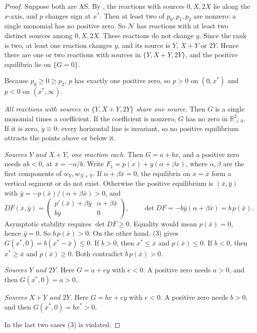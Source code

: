 \documentclass[11pt,a4paper]{report}
\providecommand{\R}{\mathbb{R}}
\newcommand{\Net}{\mathcal{N}}
\begin{document}
\begin{proof}
Suppose both are AS. By , the reactions with sources \(0,X,2X\) lie along the \(x\)-axis, and
\(p\) changes sign at \(x^*\). Then at least two of \(p_0,p_1,p_2\) are nonzero: a single monomial has no positive
zero. So \(\Net\) has reactions with at least two distinct sources among \(0,X,2X\). These reactions do not change
\(y\). Since the rank is two, at least one reaction changes \(y\), and its source is \(Y\), \(X+Y\) or \(2Y\). Hence
there are one or two reactions with sources in \(\{Y,X+Y,2Y\}\), and the positive equilibria lie on \(\{G=0\}\).

Because \(p_0\ge0\ge p_2\), \(p\) has exactly one positive zero, so \(p>0\) on \((0,x^*)\) and \(p<0\) on
\((x^*,\infty)\).

\emph{All reactions with sources in \(\{Y,X+Y,2Y\}\) share one source.} Then \(G\) is a single monomial times a
coefficient. If the coefficient is nonzero, \(G\) has no zero in \(\R^2_{>0}\). If it is zero, \(\dot y\equiv0\):
every horizontal line is invariant, so no positive equilibrium attracts the points above or below it.

\emph{Sources \(Y\) and \(X+Y\), one reaction each.} Then \(G=a+bx\), and a positive zero needs \(ab<0\), at
\(\bar x=-a/b\). Write \(F_1=p(x)+y(\alpha+\beta x)\), where \(\alpha,\beta\) are the first components of
\(w_Y,w_{X+Y}\). If \(\alpha+\beta\bar x=0\), the equilibria on \(x=\bar x\) form a vertical segment or do not exist.
Otherwise the positive equilibrium is \((\bar x,\bar y)\) with \(\bar y=-p(\bar x)/(\alpha+\beta\bar x)>0\), and
\[
DF(\bar x,\bar y)=\begin{pmatrix}p'(\bar x)+\beta\bar y & \alpha+\beta\bar x\\ b\bar y & 0\end{pmatrix},\qquad
\det DF=-b\bar y(\alpha+\beta\bar x)=b\,p(\bar x).
\]
Asymptotic stability requires \(\det DF\ge0\). Equality would mean \(p(\bar x)=0\), hence \(\bar y=0\). So
\(b\,p(\bar x)>0\). On the other hand, (3) gives \(G(x^*,0)=b(x^*-\bar x)\le0\). If \(b>0\), then
\(x^*\le\bar x\) and \(p(\bar x)\le0\). If \(b<0\), then \(x^*\ge\bar x\) and \(p(\bar x)\ge0\). Both contradict
\(b\,p(\bar x)>0\).

\emph{Sources \(Y\) and \(2Y\).} Here \(G=a+ey\) with \(e<0\). A positive zero needs \(a>0\), and then
\(G(x^*,0)=a>0\).

\emph{Sources \(X+Y\) and \(2Y\).} Here \(G=bx+ey\) with \(e<0\). A positive zero needs \(b>0\), and then
\(G(x^*,0)=bx^*>0\).

In the last two cases (3) is violated.
\end{proof}
\end{document}
